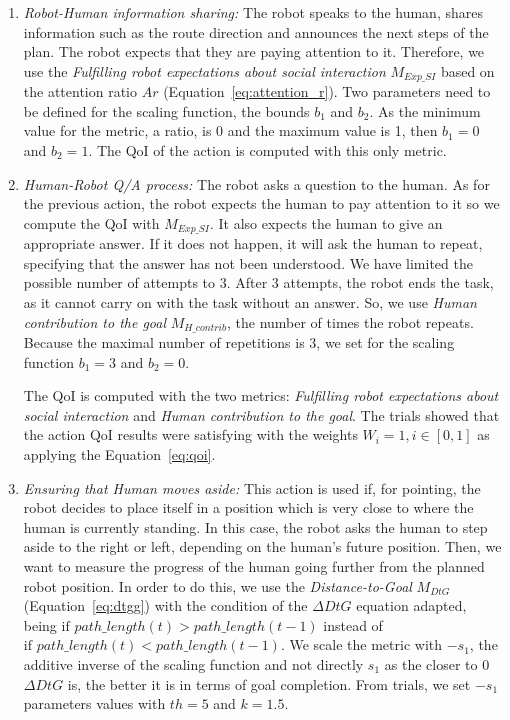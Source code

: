 \documentclass[a4paper,11pt,twoside]{StyleThese}
\begin{document}
\begin{enumerate}[label=(\alph*)]
	\item \label{list_act:info} \emph{Robot-Human information sharing: }The robot speaks to the human, shares information such as the route direction and announces the next steps of the plan. The robot expects that they are paying attention to it. Therefore, we use the \emph{Fulfilling robot expectations about social interaction} $M_{Exp\_SI}$ based on the attention ratio $Ar$ (Equation~\ref{eq:attention_r}). Two parameters need to be defined for the scaling function, the bounds $b_1$ and $b_2$. As the minimum value for the metric, a ratio, is 0 and the maximum value is 1, then $b_1=0$ and $b_2=1$. 
	The QoI of the action is computed with this only metric.
	
	\item \label{list_act:qa} \emph{Human-Robot Q/A process: } The robot asks a question to the human. As for the previous action, the robot expects the human to pay attention to it so we compute the QoI with $M_{Exp\_SI}$. It also expects the human to give an appropriate answer. If it does not happen, it will ask the human to repeat, specifying that the answer has not been understood. We have limited the possible number of attempts to 3. After 3 attempts, the robot ends the task, as it cannot carry on with the task without an answer. So, we use \emph{Human contribution to the goal} $M_{H\_contrib}$, the number of times the robot repeats. Because the maximal number of repetitions is 3, we set for the scaling function $b_1=3$ and $b_2=0$.
	
	The QoI is computed with the two metrics: \emph{Fulfilling robot expectations about social interaction} and \emph{Human contribution to the goal}.
	The trials showed that the action QoI results were satisfying with the weights $W_i=1, i \in [0,1]$ as applying the Equation~\eqref{eq:qoi}.
	
	\item \label{list_act:moves_aside} \emph{Ensuring that Human  moves aside: }This action is used if, for pointing, the robot decides to place itself in a position which is very close to where the human is currently standing. In this case, the robot asks the human to step aside to the right or left, depending on the human's future position. Then, we want to measure the progress of the human going further from the planned robot position. In order to do this, we use the \emph{Distance-to-Goal} $M_{DtG}$ (Equation~\ref{eq:dtgg}) with the condition of the $\Delta DtG$ equation adapted, being $\text{if } path\_length(t) >  path\_length(t-1)$ instead of $\text{if } path\_length(t) <  path\_length(t-1)$. We scale the metric with  $-s_1$, the additive inverse of the scaling function and not directly $s_1$ as the closer to 0 $\Delta DtG$ is, the better it is in terms of goal completion. From trials, we set $-s_1$ parameters values with $th=5$ and $k=1.5$.
	

\end{enumerate}
\end{document}
